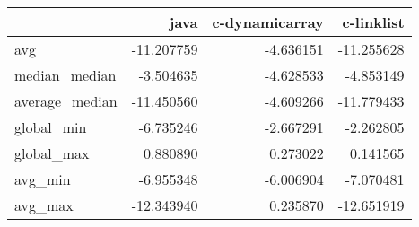 \begin{tabular}{lrrr}
\toprule
{} &       java &  c-dynamicarray &  c-linklist \\
\midrule
avg            & -11.207759 &       -4.636151 &  -11.255628 \\
median\_median  &  -3.504635 &       -4.628533 &   -4.853149 \\
average\_median & -11.450560 &       -4.609266 &  -11.779433 \\
global\_min     &  -6.735246 &       -2.667291 &   -2.262805 \\
global\_max     &   0.880890 &        0.273022 &    0.141565 \\
avg\_min        &  -6.955348 &       -6.006904 &   -7.070481 \\
avg\_max        & -12.343940 &        0.235870 &  -12.651919 \\
\bottomrule
\end{tabular}

